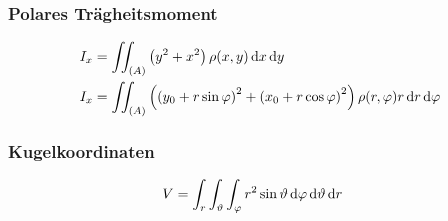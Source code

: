 \subsubsection{Polares Trägheitsmoment}
\begin{align*}
I_x&=\iint_{(A)}\left(y^2+x^2\right)\rho(x,y)\mathop{}\!\mathrm{d} x\mathop{}\!\mathrm{d} y\\
I_x&=\iint_{(A)}\left(\left(y_0+r\sin\varphi\right)^2+\left(x_0+r\cos\varphi\right)^2\right)\rho(r,\varphi)r\mathop{}\!\mathrm{d} r\mathop{}\!\mathrm{d} \varphi
\end{align*}

\subsubsection{Kugelkoordinaten}
\begin{align*}
V&=\int_r\int_\vartheta\int_\varphi r^2\sin\vartheta\mathop{}\!\mathrm{d} \varphi \mathop{}\!\mathrm{d} \vartheta \mathop{}\!\mathrm{d} r
\end{align*}